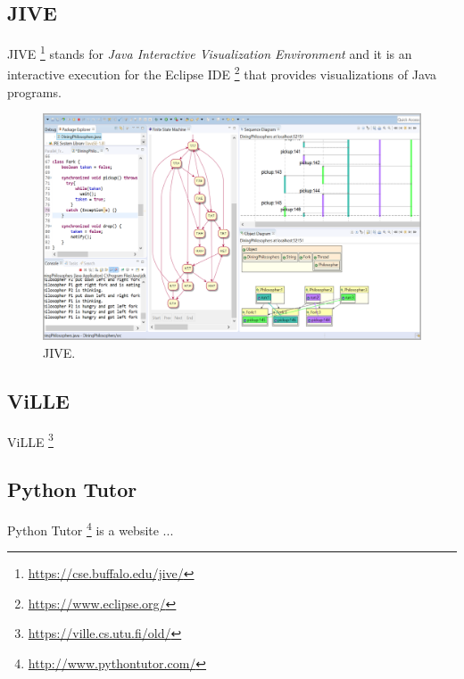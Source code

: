 \documentclass[]{usiinfbachelorproject}
\begin{document}
\vspace{\fill}
\pagebreak

\subsection{JIVE}

JIVE \footnote{\url{https://cse.buffalo.edu/jive/}} stands for \emph{Java Interactive Visualization Environment} and it is an interactive execution for the Eclipse IDE \footnote{\url{https://www.eclipse.org/}} that provides visualizations of Java programs.

\begin{figure}[h]
\centering
\includegraphics[width=\textwidth]{figures/jive.png}
\caption {JIVE.}
\end{figure}

\subsection{ViLLE}

ViLLE \footnote{\url{https://ville.cs.utu.fi/old/}}

\subsection{Python Tutor}

Python Tutor \footnote{\url{http://www.pythontutor.com/}} is a website ...
\end{document}

